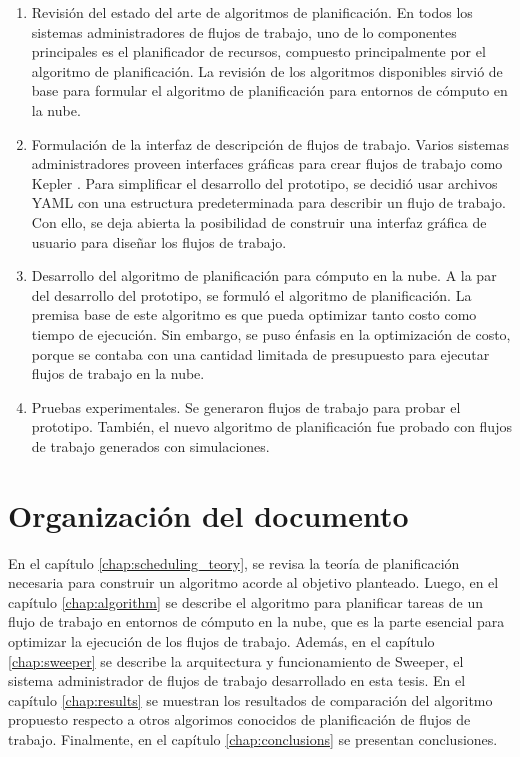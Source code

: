 \begin{enumerate}
\item Revisi\'on del estado del arte de algoritmos de planificaci\'on. En todos los sistemas administradores de flujos de trabajo, uno de lo componentes principales es el planificador de recursos, compuesto principalmente por el algoritmo de planificaci\'on. La revisi\'on de los algoritmos disponibles sirvi\'o de base para formular el algoritmo de planificaci\'on para entornos de c\'omputo en la nube.
\item Formulación de la interfaz de descripción de flujos de trabajo. Varios sistemas administradores proveen interfaces gr\'aficas para crear flujos de trabajo como Kepler \cite{altintas2016kepler}. Para simplificar el desarrollo del prototipo, se decidi\'o usar archivos YAML con una estructura predeterminada para describir un flujo de trabajo. Con ello, se deja abierta la posibilidad de construir una interfaz gráfica de usuario para diseñar los flujos de trabajo.
\item Desarrollo del algoritmo de planificaci\'on para c\'omputo en la nube. A la par del desarrollo del prototipo, se formul\'o el algoritmo de planificaci\'on. La premisa base de este algoritmo es que pueda optimizar tanto costo como tiempo de ejecuci\'on. Sin embargo, se puso \'enfasis en la optimizaci\'on de costo, porque se contaba con una cantidad limitada de presupuesto para ejecutar flujos de trabajo en la nube. 
\item Pruebas experimentales. Se generaron flujos de trabajo para probar el prototipo. También, el nuevo algoritmo de planificaci\'on fue probado con flujos de trabajo generados con simulaciones.
\end{enumerate}

\section{Organización del documento}

En el capítulo \ref{chap:scheduling_teory}, se revisa la teoría de planificación necesaria para construir un algoritmo acorde al objetivo planteado. Luego, en el capítulo \ref{chap:algorithm} se describe el algoritmo para planificar tareas de un flujo de trabajo en entornos de cómputo en la nube, que es la parte esencial para optimizar la ejecución de los flujos de trabajo. Además, en el capítulo \ref{chap:sweeper} se describe la arquitectura y funcionamiento de Sweeper, el sistema administrador de flujos de trabajo desarrollado en esta tesis. En el cap\'itulo \ref{chap:results} se muestran los resultados de comparaci\'on del algoritmo propuesto respecto a otros algorimos conocidos de planificaci\'on de flujos de trabajo. Finalmente, en el capítulo \ref{chap:conclusions} se presentan conclusiones.

